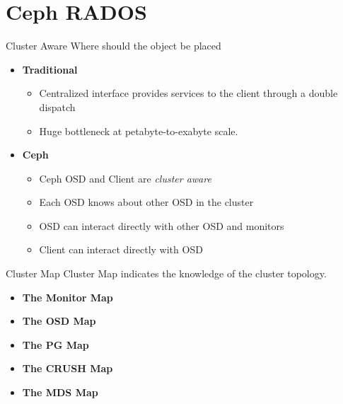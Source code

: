 \section{Ceph RADOS}

\begin{frame}{Cluster Aware}
    Where should the object be placed
    \begin{itemize}
        \item \textbf{Traditional}
            \begin{itemize}
                \item Centralized interface provides services to the client through a double dispatch
                \item Huge bottleneck at petabyte-to-exabyte scale.
            \end{itemize}
        \item \textbf{Ceph}
            \begin{itemize}
                \item Ceph OSD and Client are \textit{cluster aware}
                \item Each OSD knows about other OSD in the cluster
                \item OSD can interact directly with other OSD and monitors
                \item Client can interact directly with OSD
            \end{itemize}
    \end{itemize}
\end{frame}


\begin{frame}{Cluster Map}
    Cluster Map indicates the knowledge of the cluster topology.
    \begin{itemize}
        \item \textbf{The Monitor Map}
        \item \textbf{The OSD Map}
        \item \textbf{The PG Map}
        \item \textbf{The CRUSH Map}
        \item \textbf{The MDS Map} 
    \end{itemize}
\end{frame}

